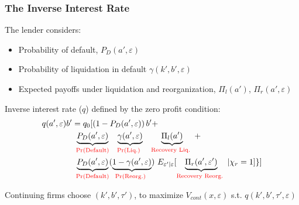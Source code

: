 \documentclass[aspectratio=169,xcolor=table]{beamer}
\begin{document}
\begin{frame}[label=Qfull] \frametitle{The Inverse Interest Rate  \hfill\hyperlink{ContFirms}{}}

The lender considers: \small 
\begin{itemize}\setlength\itemsep{0em} 
    \item Probability of default, $P_D(a', \varepsilon)$
    \item Probability of liquidation in default $\gamma(k',b', \varepsilon)$
    \item Expected payoffs under liquidation and reorganization,  $\Pi_{l}(a')$, $\Pi_{r}(a', \varepsilon)$
\end{itemize} \normalsize

Inverse interest rate ($q$) defined by the zero profit condition:
\begin{equation*} \label{eq:q}
    \begin{split}
        & q(a', \varepsilon)b' = q_0 [ \left(1-P_D(a', \varepsilon)\right)b' +  \\
        & \qquad \qquad \underbrace{P_D(a', \varepsilon)}_{\textcolor{red}{\text{Pr(Default)}}} \underbrace{\gamma(a', \varepsilon)}_{\textcolor{red}{\text{\quad Pr(Liq.) \quad }}} \underbrace{\Pi_{l}(a')}_{\textcolor{red}{\text{Recovery Liq. }}} + \\  
        & \qquad  \qquad \underbrace{P_D(a', \varepsilon)}_{\textcolor{red}{\text{Pr(Default)}}}  (\underbrace{1-\gamma(a', \varepsilon)}_{\textcolor{red}{\text{Pr(Reorg.) }}})\ E_{\varepsilon' | \varepsilon} [ \underbrace{\Pi_{r}(a', \varepsilon')}_{\textcolor{red}{\text{Recovery Reorg. }}} |\chi_r = 1 ] \} ]
    \end{split}
\end{equation*}

Continuing firms choose $(k',b',\tau')$, to maximize $V_{cont}(x,\varepsilon)$ s.t. $q(k',b',\tau', \varepsilon)$ 

\end{frame}
\end{document}
